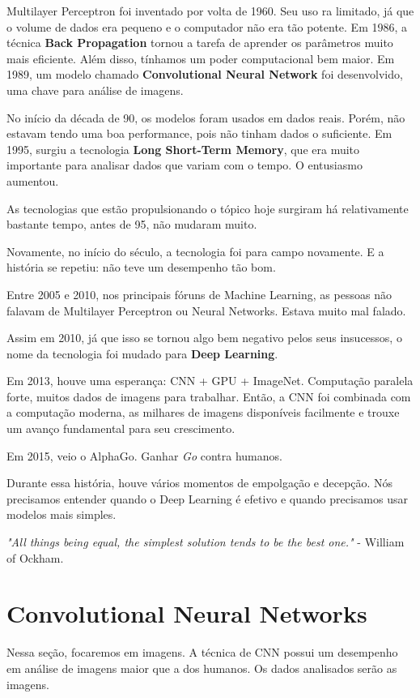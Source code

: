 \documentclass[11pt, a4paper]{article}
\begin{document}
Multilayer Perceptron foi inventado por volta de 1960. Seu uso ra limitado, já que o volume de dados era pequeno e o computador não era tão potente. Em 1986, a técnica \textbf{Back Propagation} tornou a tarefa de aprender os parâmetros muito mais eficiente. Além disso, tínhamos um poder computacional bem maior. Em 1989, um modelo chamado \textbf{Convolutional Neural Network} foi desenvolvido, uma chave para análise de imagens.

No início da década de 90, os modelos foram usados em dados reais. Porém, não estavam tendo uma boa performance, pois não tinham dados o suficiente. Em 1995, surgiu a tecnologia \textbf{Long Short-Term Memory}, que era muito importante para analisar dados que variam com o tempo. O entusiasmo aumentou. 

As tecnologias que estão propulsionando o tópico hoje surgiram há relativamente bastante tempo, antes de 95, não mudaram muito.

Novamente, no início do século, a tecnologia foi para campo novamente. E a história se repetiu: não teve um desempenho tão bom.

Entre 2005 e 2010, nos principais fóruns de Machine Learning, as pessoas não falavam de Multilayer Perceptron ou Neural Networks. Estava muito mal falado.

Assim em 2010, já que isso se tornou algo bem negativo pelos seus insucessos, o nome da tecnologia foi mudado para \textbf{Deep Learning}.

Em 2013, houve uma esperança: CNN + GPU + ImageNet. Computação paralela forte, muitos dados de imagens para trabalhar. Então, a CNN foi combinada com a computação moderna, as milhares de imagens disponíveis facilmente e trouxe um avanço fundamental para seu crescimento.

Em 2015, veio o AlphaGo. Ganhar \textit{Go} contra humanos.

Durante essa história, houve vários momentos de empolgação e decepção. Nós precisamos entender quando o Deep Learning é efetivo e quando precisamos usar modelos mais simples.

\textit{"All things being equal, the simplest solution tends to be the best one."} - William of Ockham.

\pagebreak
\section{Convolutional Neural Networks}

Nessa seção, focaremos em imagens. A técnica de CNN possui um desempenho em análise de imagens maior que a dos humanos. Os dados analisados serão as imagens.
\end{document}
